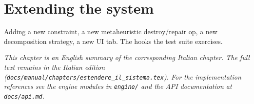 \chapter{Extending the system}
\label{ch:estendere_il_sistema_en}

Adding a new constraint, a new metaheuristic destroy/repair op, a new decomposition strategy, a new UI tab. The hooks the test suite exercises.

\medskip
\noindent
\textit{This chapter is an English summary of the corresponding Italian chapter. The full text remains in the Italian edition (\texttt{docs/manual/chapters/estendere\_il\_sistema.tex}). For the implementation references see the engine modules in \texttt{engine/} and the API documentation at \texttt{docs/api.md}.}
